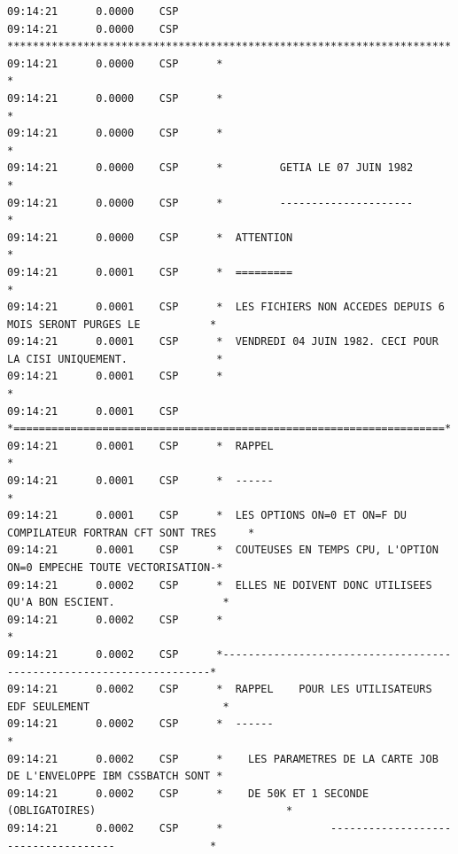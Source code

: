 {\fontsize{5}{6}\selectfont
\begin{verbatim}
09:14:21      0.0000    CSP
09:14:21      0.0000    CSP      **********************************************************************
09:14:21      0.0000    CSP      *                                                                    *
09:14:21      0.0000    CSP      *                                                                    *
09:14:21      0.0000    CSP      *                                                                    *
09:14:21      0.0000    CSP      *         GETIA LE 07 JUIN 1982                                      *
09:14:21      0.0000    CSP      *         ---------------------                                      *
09:14:21      0.0000    CSP      *  ATTENTION                                                         *
09:14:21      0.0001    CSP      *  =========                                                         *
09:14:21      0.0001    CSP      *  LES FICHIERS NON ACCEDES DEPUIS 6 MOIS SERONT PURGES LE           *
09:14:21      0.0001    CSP      *  VENDREDI 04 JUIN 1982. CECI POUR LA CISI UNIQUEMENT.              *
09:14:21      0.0001    CSP      *                                                                    *
09:14:21      0.0001    CSP      *====================================================================*
09:14:21      0.0001    CSP      *  RAPPEL                                                            *
09:14:21      0.0001    CSP      *  ------                                                            *
09:14:21      0.0001    CSP      *  LES OPTIONS ON=0 ET ON=F DU COMPILATEUR FORTRAN CFT SONT TRES     *
09:14:21      0.0001    CSP      *  COUTEUSES EN TEMPS CPU, L'OPTION ON=0 EMPECHE TOUTE VECTORISATION-*
09:14:21      0.0002    CSP      *  ELLES NE DOIVENT DONC UTILISEES QU'A BON ESCIENT.                 *
09:14:21      0.0002    CSP      *                                                                    *
09:14:21      0.0002    CSP      *--------------------------------------------------------------------*
09:14:21      0.0002    CSP      *  RAPPEL    POUR LES UTILISATEURS EDF SEULEMENT                     *
09:14:21      0.0002    CSP      *  ------                                                            *
09:14:21      0.0002    CSP      *    LES PARAMETRES DE LA CARTE JOB DE L'ENVELOPPE IBM CSSBATCH SONT *
09:14:21      0.0002    CSP      *    DE 50K ET 1 SECONDE (OBLIGATOIRES)                              *
09:14:21      0.0002    CSP      *                 ------------------------------------               *

\end{verbatim}}
